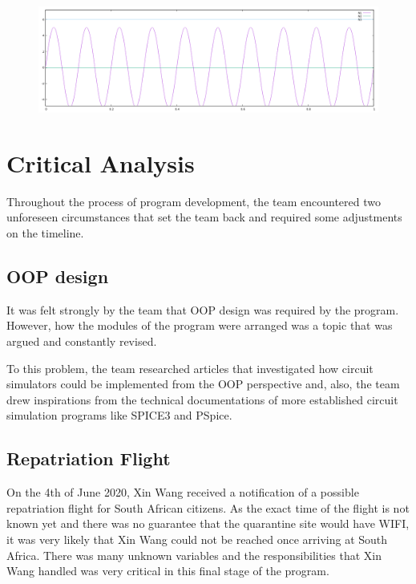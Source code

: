 \documentclass[12pt,a4paper]{article}
\begin{document}
\begin{figure} [h!]
	\centering
	\includegraphics[scale=0.25]{test_4_output_graph.PNG}
\end{figure}
\par
\pagebreak

\section{Critical Analysis}
Throughout the process of program development, the team encountered two unforeseen circumstances that set the team back 
and required some adjustments on the timeline.
\subsection{OOP design}
It was felt strongly by the team that OOP design was required by the program. However, how the modules of the program were 
arranged was a topic that was argued and constantly revised. \par 
To this problem, the team researched articles that investigated how circuit simulators could be implemented from the 
OOP perspective and, also, the team drew inspirations from the technical documentations of more established circuit 
simulation programs like SPICE3 and PSpice.
\subsection{Repatriation Flight}
On the 4th of June 2020, Xin Wang received a notification of a possible repatriation flight for South African citizens.
As the exact time of the flight is not known yet and there was no guarantee that the quarantine site would have WIFI, it
was very likely that Xin Wang could not be reached once arriving at South Africa. There was many unknown variables and the 
responsibilities that Xin Wang handled was very critical in this final stage of the program. \par 
\end{document}
